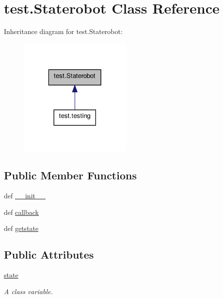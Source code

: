 \hypertarget{classtest_1_1Staterobot}{\section{test.\+Staterobot Class Reference}
\label{classtest_1_1Staterobot}
}


Inheritance diagram for test.\+Staterobot\+:\nopagebreak
\begin{figure}[H]
\begin{center}
\leavevmode
\includegraphics[width=160pt]{classtest_1_1Staterobot__inherit__graph}
\end{center}
\end{figure}
\subsection*{Public Member Functions}
\begin{DoxyCompactItemize}
\item 
def \hyperlink{classtest_1_1Staterobot_a825aa6cfc4a937fae93b18eb22d5049d}{\+\_\+\+\_\+init\+\_\+\+\_\+}
\item 
def \hyperlink{classtest_1_1Staterobot_a2c8f2fc540f84bfc18477fdde6510bfa}{callback}
\item 
def \hyperlink{classtest_1_1Staterobot_a5663f3bcd6262303e19c4735396cbef2}{getstate}
\end{DoxyCompactItemize}
\subsection*{Public Attributes}
\begin{DoxyCompactItemize}
\item 
\hypertarget{classtest_1_1Staterobot_a6ac3890142e62ba6a4e96f3090fa9b38}{\hyperlink{classtest_1_1Staterobot_a6ac3890142e62ba6a4e96f3090fa9b38}{state}}\label{classtest_1_1Staterobot_a6ac3890142e62ba6a4e96f3090fa9b38}

\begin{DoxyCompactList}\small\item\em A class variable. \end{DoxyCompactList}\end{DoxyCompactItemize}


